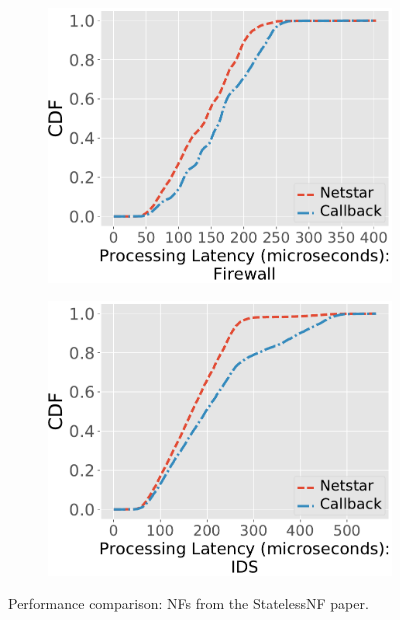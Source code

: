 \begin{figure}[!h]
\begin{subfigure}[t]{0.49\linewidth}
    \caption{}\label{fig:eval3.2}
  \end{subfigure}\hfill
  \begin{subfigure}[t]{0.49\linewidth}
    \centering
    \includegraphics[width=\columnwidth]{chap-netstar/figure_src/firewall_throughput_latency_cdf.pdf}
    \caption{}\label{fig:eval3.3}
  \end{subfigure}\hfill
  \begin{subfigure}[t]{0.49\linewidth}
    \centering
    \includegraphics[width=\columnwidth]{chap-netstar/figure_src/ids_throughput_latency_cdf.pdf}
    \caption{}\label{fig:eval3.4}
  \end{subfigure}
\caption{Performance comparison: NFs from the StatelessNF paper.}
\label{fig:eval3}
\end{figure}



